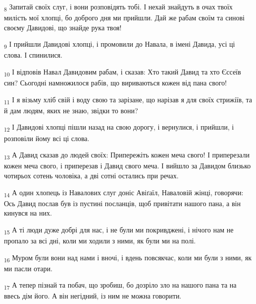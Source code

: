 \begin{tcolorbox}
\textsubscript{8} Запитай своїх слуг, і вони розповідять тобі. І нехай знайдуть в очах твоїх милість мої хлопці, бо доброго дня ми прийшли. Дай же рабам своїм та синові своєму Давидові, що знайде рука твоя!
\end{tcolorbox}
\begin{tcolorbox}
\textsubscript{9} І прийшли Давидові хлопці, і промовили до Навала, в імені Давида, усі ці слова. І спинилися.
\end{tcolorbox}
\begin{tcolorbox}
\textsubscript{10} І відповів Навал Давидовим рабам, і сказав: Хто такий Давид та хто Єссеїв син? Сьогодні намножилося рабів, що вириваються кожен від пана свого!
\end{tcolorbox}
\begin{tcolorbox}
\textsubscript{11} І я візьму хліб свій і воду свою та зарізане, що нарізав я для своїх стрижіїв, та й дам людям, яких не знаю, звідки то вони?
\end{tcolorbox}
\begin{tcolorbox}
\textsubscript{12} І Давидові хлопці пішли назад на свою дорогу, і вернулися, і прийшли, і розповіли йому всі ці слова.
\end{tcolorbox}
\begin{tcolorbox}
\textsubscript{13} А Давид сказав до людей своїх: Припережіть кожен меча свого! І приперезали кожен меча свого, і приперезав і Давид свого меча. І вийшло за Давидом близько чотирьох сотень чоловіка, а дві сотні остались при речах.
\end{tcolorbox}
\begin{tcolorbox}
\textsubscript{14} А один хлопець із Навалових слуг доніс Авіґаїл, Наваловій жінці, говорячи: Ось Давид послав був із пустині посланців, щоб привітати нашого пана, а він кинувся на них.
\end{tcolorbox}
\begin{tcolorbox}
\textsubscript{15} А ті люди дуже добрі для нас, і не були ми покривджені, і нічого нам не пропало за всі дні, коли ми ходили з ними, як були ми на полі.
\end{tcolorbox}
\begin{tcolorbox}
\textsubscript{16} Муром були вони над нами і вночі, і вдень повсякчас, коли ми були з ними, як ми пасли отари.
\end{tcolorbox}
\begin{tcolorbox}
\textsubscript{17} А тепер пізнай та побач, що зробиш, бо дозріло зло на нашого пана та на ввесь дім його. А він негідний, із ним не можна говорити.
\end{tcolorbox}

